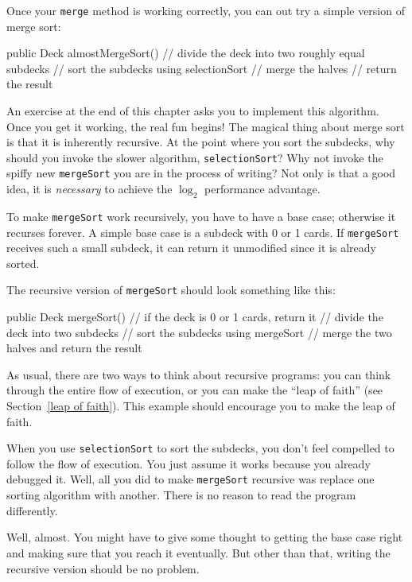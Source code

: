 \documentclass[12pt]{book}
\theoremstyle{exercise}
\newcommand{\java}[1]{\verb"#1"}
\newcommand{\java}[1]{\lstinline{#1}} %
\begin{document}
Once your \java{merge} method is working correctly, you can out try a simple version of merge sort:

\begin{code}
public Deck almostMergeSort() {
    // divide the deck into two roughly equal subdecks
    // sort the subdecks using selectionSort
    // merge the halves
    // return the result
}
\end{code}

An exercise at the end of this chapter asks you to implement this algorithm.
Once you get it working, the real fun begins!
The magical thing about merge sort is that it is inherently recursive.
At the point where you sort the subdecks, why should you invoke the slower algorithm, \java{selectionSort}?
Why not invoke the spiffy new \java{mergeSort} you are in the process of writing?
Not only is that a good idea, it is {\em necessary} to achieve the $\log_2$ performance advantage.

To make \java{mergeSort} work recursively, you have to have a base case; otherwise it recurses forever.
A simple base case is a subdeck with 0 or 1 cards.
If \java{mergeSort} receives such a small subdeck, it can return it unmodified since it is already sorted.

The recursive version of \java{mergeSort} should look something like this:

\begin{code}
public Deck mergeSort() {
    // if the deck is 0 or 1 cards, return it
    // divide the deck into two subdecks
    // sort the subdecks using mergeSort
    // merge the two halves and return the result
}
\end{code}


As usual, there are two ways to think about recursive programs: you can think through the entire flow of execution, or you can make the ``leap of faith'' (see Section~\ref{leap of faith}).
This example should encourage you to make the leap of faith.

When you use \java{selectionSort} to sort the subdecks, you don't feel compelled to follow the flow of execution.
You just assume it works because you already debugged it.
Well, all you did to make \java{mergeSort} recursive was replace one sorting algorithm with another.
There is no reason to read the program differently.

Well, almost.  You might have to give some thought to getting the base case right and making sure that you reach it eventually.
But other than that, writing the recursive version should be no problem.
\end{document}
